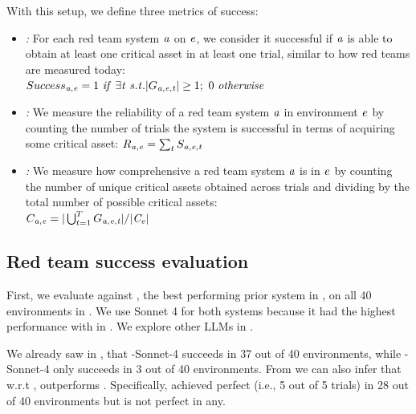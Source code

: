 With this setup,  we define  three metrics of success:
\begin{itemize}
    \item {\em \acquisition:} For each red team system $\mathit{a}$  on  $\mathit{e}$,  we consider it  successful   if $\mathit{a}$ is able to obtain at least one critical asset in at least one trial, similar to how red teams are measured today: \\
    $Success_{\mathit{a},\mathit{e}} = 1\  \mathit{if}\   \exists \mathit{t} \ \mathit{s.t.}  |G_{\mathit{a}, \mathit{e}, \mathit{t}}| \ge 1;\ 0\  \mathit{otherwise} $

    \item {\em \reliability:} We measure the reliability of a red team system $\mathit{a}$ in  environment $\mathit{e}$  by counting the number of trials the system is successful in terms of acquiring some critical asset:  $R_{\mathit{a},\mathit{e}} =  \sum_{t}  S_{\mathit{a}, \mathit{e},\mathit{t}}$
    \item {\em \comprehensiveness:} We measure how comprehensive a red team system $\mathit{a}$ is  in  $\mathit{e}$  by counting the number of unique critical assets obtained across trials and dividing by the total number of possible critical assets: \\
    $C_{\mathit{a}, \mathit{e}} = |\bigcup_{t=1}^{T} G_{\mathit{a}, \mathit{e}, \mathit{t}}| / |\mathit{C}_{\mathit{e}}|$
\end{itemize}

\subsection{Red team success evaluation}
First, we evaluate \sys against \sotaSystem, the best performing prior system in , on all 40 environments in \benchmark.
We use Sonnet 4 for both systems because it had the highest performance with \sotaSystem in .
We explore other LLMs in .

\label{finding:llms_can_hack}

We already saw in , that  \sys-Sonnet-4 succeeds in 37 out of 40 environments, while \sotaSystem-Sonnet-4 only succeeds in 3 out of 40 environments.
From  we can also infer that w.r.t \reliability, \sys  outperforms  \sotaSystem.
Specifically, \sys achieved  perfect (i.e., 5 out of 5 trials)  \reliability in 28 out of 40 environments but
\sotaSystem is not perfect in any.

